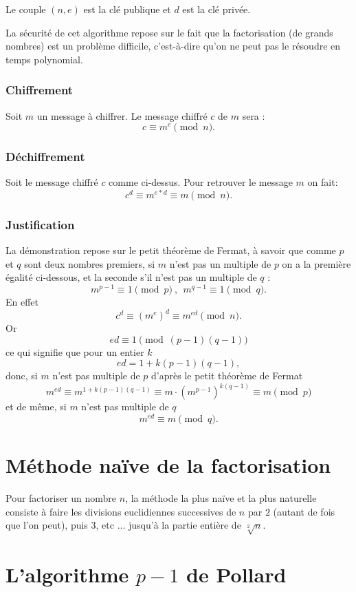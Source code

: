 \documentclass[french, 12pt, titlepage]{article}
\begin{document}
Le couple $(n, e)$ est la clé publique et $d$ est la clé privée.

La sécurité de cet algorithme repose sur le fait que la factorisation (de grands nombres) est un problème difficile, c'est-à-dire qu'on ne peut pas le résoudre en temps polynomial.

\subsubsection{Chiffrement}
Soit $m$ un message à chiffrer. Le message chiffré $c$ de $m$ sera :
\[ c \equiv m^e \pmod n .\]
\subsubsection{Déchiffrement}

Soit le message chiffré $c$ comme ci-dessus. Pour retrouver le message $m$ on fait:
\[ c^d \equiv m^{e*d} \equiv m \pmod n.\]

\subsubsection{Justification}

La démonstration repose sur le petit théorème de Fermat, à savoir que comme $p$ et $q$ sont deux nombres premiers, si $m$ n'est pas un multiple de $p$ on a la première égalité ci-dessous, et la seconde s'il n'est pas un multiple de $q$ :
\[ m^{p-1} \equiv 1 \pmod p\ ,\ \ m^{q-1} \equiv 1 \pmod q.\]
En effet
\[ c^d \equiv (m^e)^d \equiv m^{ed} \pmod n.\]
Or
\[ed \equiv 1 \pmod{(p-1)(q-1)}\]
ce qui signifie que pour un entier $k$
\[ed = 1 + k(p-1)(q-1),\]
donc, si $m$ n'est pas multiple de $p$ d'après le petit théorème de Fermat
\[m^{ed} \equiv m^{1+k(p-1)(q-1) }\equiv m\cdot \left(m^{p-1}\right)^{k(q-1)}\equiv m \pmod p\]
et de même, si $m$ n'est pas multiple de $q$
\[m^{ed}\equiv m \pmod q.\]

\section{Méthode naïve de la factorisation}

Pour factoriser un nombre $n$, la méthode la plus naïve et la plus naturelle consiste à faire les divisions euclidiennes successives de $n$ par $2$ (autant de fois que l'on peut), puis $3$, etc ... jusqu'à la partie entière de $\sqrt[2]{n}$.


\section{L'algorithme $p-1$ de Pollard}
\end{document}
